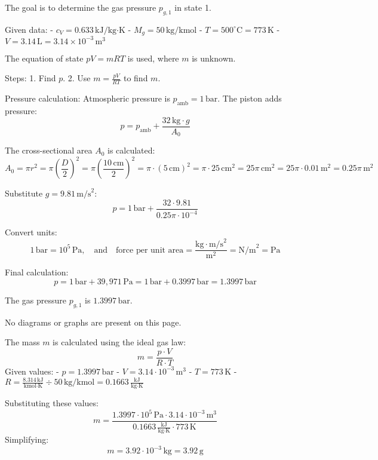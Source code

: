 The goal is to determine the gas pressure \( p_{g,1} \) in state 1.  

Given data:  
- \( c_V = 0.633 \, \text{kJ/kg·K} \)  
- \( M_g = 50 \, \text{kg/kmol} \)  
- \( T = 500^\circ\text{C} = 773 \, \text{K} \)  
- \( V = 3.14 \, \text{L} = 3.14 \times 10^{-3} \, \text{m}^3 \)  

The equation of state \( pV = mRT \) is used, where \( m \) is unknown.  

Steps:  
1. Find \( p \).  
2. Use \( m = \frac{pV}{RT} \) to find \( m \).  

Pressure calculation:  
Atmospheric pressure is \( p_{\text{amb}} = 1 \, \text{bar} \). The piston adds pressure:  
\[
p = p_{\text{amb}} + \frac{32 \, \text{kg} \cdot g}{A_0}
\]  

The cross-sectional area \( A_0 \) is calculated:  
\[
A_0 = \pi r^2 = \pi \left( \frac{D}{2} \right)^2 = \pi \left( \frac{10 \, \text{cm}}{2} \right)^2 = \pi \cdot (5 \, \text{cm})^2 = \pi \cdot 25 \, \text{cm}^2 = 25 \pi \, \text{cm}^2 = 25 \pi \cdot 0.01 \, \text{m}^2 = 0.25 \pi \, \text{m}^2
\]  

Substitute \( g = 9.81 \, \text{m/s}^2 \):  
\[
p = 1 \, \text{bar} + \frac{32 \cdot 9.81}{0.25 \pi \cdot 10^{-4}}
\]  

Convert units:  
\[
1 \, \text{bar} = 10^5 \, \text{Pa}, \quad \text{and} \quad \text{force per unit area} = \frac{\text{kg} \cdot \text{m/s}^2}{\text{m}^2} = \text{N/m}^2 = \text{Pa}
\]  

Final calculation:  
\[
p = 1 \, \text{bar} + 39,971 \, \text{Pa} = 1 \, \text{bar} + 0.3997 \, \text{bar} = 1.3997 \, \text{bar}
\]  

The gas pressure \( p_{g,1} \) is \( 1.3997 \, \text{bar} \).  

No diagrams or graphs are present on this page.

The mass \( m \) is calculated using the ideal gas law:  
\[
m = \frac{p \cdot V}{R \cdot T}
\]  
Given values:  
- \( p = 1.3997 \, \text{bar} \)  
- \( V = 3.14 \cdot 10^{-3} \, \text{m}^3 \)  
- \( T = 773 \, \text{K} \)  
- \( R = \frac{8.314 \, \text{kJ}}{\text{kmol} \cdot \text{K}} \div 50 \, \text{kg/kmol} = 0.1663 \, \frac{\text{kJ}}{\text{kg} \cdot \text{K}} \)  

Substituting these values:  
\[
m = \frac{1.3997 \cdot 10^5 \, \text{Pa} \cdot 3.14 \cdot 10^{-3} \, \text{m}^3}{0.1663 \, \frac{\text{kJ}}{\text{kg} \cdot \text{K}} \cdot 773 \, \text{K}}
\]  
Simplifying:  
\[
m = 3.92 \cdot 10^{-3} \, \text{kg} = 3.92 \, \text{g}
\]